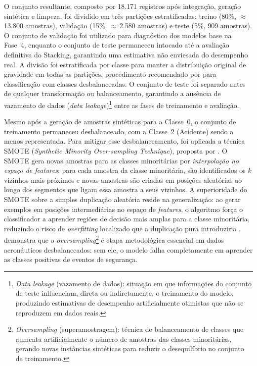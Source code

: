 \documentclass[english,brazilian]{UNISINOSartigo}
\begin{document}
O conjunto resultante, composto por 18.171 registros após integração, geração
sintética e limpeza, foi dividido em três partições estratificadas: treino
(80\%, $\approx$\,13.800 amostras), validação (15\%, $\approx$\,2.580 amostras)
e teste (5\%, 909 amostras). O conjunto de validação foi utilizado para
diagnóstico dos modelos base na Fase~4, enquanto o conjunto de teste permaneceu
intocado até a avaliação definitiva do Stacking, garantindo uma estimativa não
enviesada do desempenho real. A divisão foi estratificada por classe para manter
a distribuição original de gravidade em todas as partições, procedimento
recomendado por  para classificação com classes
desbalanceadas. O conjunto de teste foi separado antes de qualquer
transformação ou balanceamento, garantindo a ausência de vazamento de dados
(\textit{data leakage})\footnote{\textit{Data leakage} (vazamento de dados):
situação em que informações do conjunto de teste influenciam, direta ou
indiretamente, o treinamento do modelo, produzindo estimativas de desempenho
artificialmente otimistas que não se reproduzem em dados reais.} entre as
fases de treinamento e avaliação.

Mesmo após a geração de amostras sintéticas para a Classe~0, o conjunto de
treinamento permaneceu desbalanceado, com a Classe~2 (Acidente) sendo a
menos representada. Para mitigar esse desbalanceamento, foi aplicada a técnica
SMOTE (\textit{Synthetic Minority Over-sampling Technique}), proposta
por . O SMOTE gera novas amostras para as classes
minoritárias por \textit{interpolação no espaço de features}: para cada amostra
da classe minoritária, são identificados os $k$ vizinhos mais próximos e novas
amostras são criadas em posições aleatórias ao longo dos segmentos que ligam
essa amostra a seus vizinhos. A superioridade do SMOTE sobre a simples
duplicação aleatória reside na generalização: ao gerar exemplos em posições
intermediárias no espaço de \textit{features}, o algoritmo força o classificador
a aprender regiões de decisão mais amplas para a classe minoritária, reduzindo o
risco de \textit{overfitting} localizado que a duplicação pura introduziria
\cite{CHAWLA2002}.  demonstra que o
\textit{oversampling}\footnote{\textit{Oversampling} (superamostragem): técnica
de balanceamento de classes que aumenta artificialmente o número de amostras das
classes minoritárias, gerando novas instâncias sintéticas para reduzir o
desequilíbrio no conjunto de treinamento.} é etapa metodológica essencial em
dados aeronáuticos desbalanceados: sem ele, o modelo falha completamente em
aprender as classes positivas de eventos de segurança.
\end{document}
